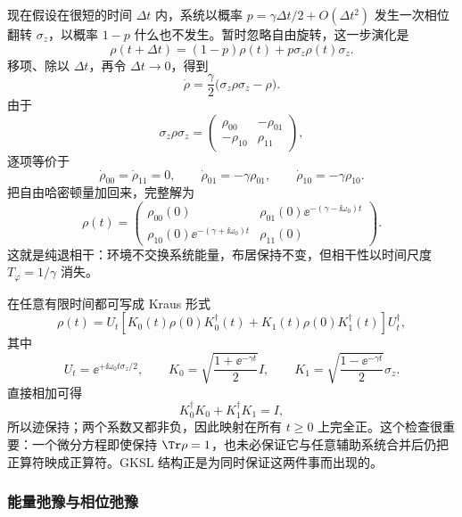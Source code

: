 现在假设在很短的时间 \(\Delta t\) 内，系统以概率 \(p=\gamma\Delta t/2+O(\Delta t^2)\) 发生一次相位翻转 \(\sigma_z\)，以概率 \(1-p\) 什么也不发生。暂时忽略自由旋转，这一步演化是
\[
 \rho(t+\Delta t)
 =(1-p)\rho(t)+p\sigma_z\rho(t)\sigma_z.
\]
移项、除以 \(\Delta t\)，再令 \(\Delta t\to0\)，得到
\begin{equation}
 \dot\rho
 =\frac{\gamma}{2}\bigl(\sigma_z\rho\sigma_z-\rho\bigr).
 \label{eq:phys-oqs-elementary-dephasing-generator}
\end{equation}
由于
\[
 \sigma_z\rho\sigma_z
 =\begin{pmatrix}
 \rho_{00}&-\rho_{01}\\
 -\rho_{10}&\rho_{11}
 \end{pmatrix},
\]
逐项等价于
\[
 \dot\rho_{00}=\dot\rho_{11}=0,
 \qquad
 \dot\rho_{01}=-\gamma\rho_{01},
 \qquad
 \dot\rho_{10}=-\gamma\rho_{10}.
\]
把自由哈密顿量加回来，完整解为
\begin{equation}
 \rho(t)=
 \begin{pmatrix}
 \rho_{00}(0)&
 \rho_{01}(0)\ee^{-(\gamma-\ii\omega_0)t}\\
 \rho_{10}(0)\ee^{-(\gamma+\ii\omega_0)t}&
 \rho_{11}(0)
 \end{pmatrix}.
 \label{eq:phys-oqs-elementary-dephasing-solution}
\end{equation}
这就是纯退相干：环境不交换系统能量，布居保持不变，但相干性以时间尺度 \(T_\varphi=1/\gamma\) 消失。

在任意有限时间都可写成 Kraus 形式
\begin{equation}
 \rho(t)=U_t
 \left[K_0(t)\rho(0)K_0^\dagger(t)
 +K_1(t)\rho(0)K_1^\dagger(t)\right]U_t^\dagger,
 \label{eq:phys-oqs-dephasing-kraus-solution}
\end{equation}
其中
\[
 U_t=\ee^{+\ii\omega_0t\sigma_z/2},
 \qquad
 K_0=\sqrt{\frac{1+\ee^{-\gamma t}}{2}}I,
 \qquad
 K_1=\sqrt{\frac{1-\ee^{-\gamma t}}{2}}\sigma_z.
\]
直接相加可得
\[
 K_0^\dagger K_0+K_1^\dagger K_1=I,
\]
所以迹保持；两个系数又都非负，因此映射在所有 \(t\geq0\) 上完全正。这个检查很重要：一个微分方程即使保持 \(\Tr\rho=1\)，也未必保证它与任意辅助系统合并后仍把正算符映成正算符。GKSL 结构正是为同时保证这两件事而出现的。

\subsubsection{能量弛豫与相位弛豫}

